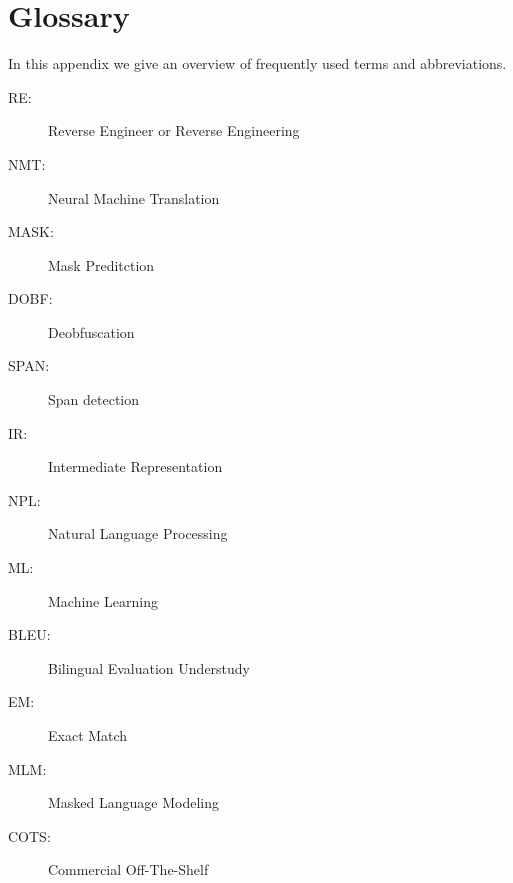 \chapter{\label{cha:glossary}Glossary}

In this appendix we give an overview of frequently used terms and
abbreviations.

\begin{description}
\item[RE:] Reverse Engineer or Reverse Engineering
\item[NMT:] Neural Machine Translation
\item[MASK:] Mask Preditction
\item[DOBF:] Deobfuscation
\item[SPAN:] Span detection
\item[IR:] Intermediate Representation
\item[NPL:] Natural Language Processing
\item[ML:] Machine Learning
\item[BLEU:] Bilingual Evaluation Understudy
\item[EM: ] Exact Match
\item[MLM:] Masked Language Modeling
\item[COTS: ] Commercial Off-The-Shelf
\end{description}

